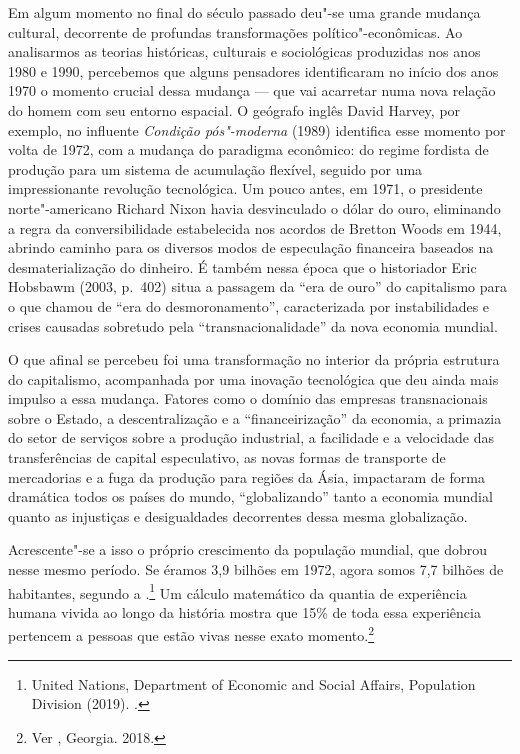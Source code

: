 Em algum momento no final do século passado deu"-se uma grande mudança
cultural, decorrente de profundas transformações político"-econômicas. Ao
analisarmos as teorias históricas, culturais e sociológicas produzidas
nos anos 1980 e 1990, percebemos que alguns pensadores identificaram no
início dos anos 1970 o momento crucial dessa mudança --- que vai
acarretar numa nova relação do homem com seu entorno espacial. O
geógrafo inglês David Harvey, por exemplo, no influente \emph{Condição
pós"-moderna} (1989) identifica esse momento por volta de 1972, com a
mudança do paradigma econômico: do regime fordista de produção para um
sistema de acumulação flexível, seguido por uma impressionante revolução
tecnológica. Um pouco antes, em 1971, o presidente norte"-americano
Richard Nixon havia desvinculado o dólar do ouro, eliminando a regra da
conversibilidade estabelecida nos acordos de Bretton Woods em 1944,
abrindo caminho para os diversos modos de especulação financeira
baseados na desmaterialização do dinheiro. É também nessa época que o
historiador Eric Hobsbawm (2003, p.~402) situa a passagem da ``era de ouro'' do
capitalismo para o que chamou de ``era do desmoronamento'',
caracterizada por instabilidades e crises causadas sobretudo pela
``transnacionalidade'' da nova economia mundial.

O que afinal se percebeu foi uma transformação no interior da própria
estrutura do capitalismo, acompanhada por uma inovação tecnológica que
deu ainda mais impulso a essa mudança. Fatores como o domínio das
empresas transnacionais sobre o Estado, a descentralização e a
``financeirização'' da economia, a primazia do setor de serviços sobre a
produção industrial, a facilidade e a velocidade das transferências de
capital especulativo, as novas formas de transporte de mercadorias e a
fuga da produção para regiões da Ásia, impactaram de forma dramática
todos os países do mundo, ``globalizando'' tanto a economia mundial
quanto as injustiças e desigualdades decorrentes dessa mesma
globalização.

Acrescente"-se a isso o próprio crescimento da população mundial, que
dobrou nesse mesmo período. Se éramos 3,9 bilhões em 1972, agora somos %
7,7 bilhões de habitantes, segundo a .\footnote{United Nations,
  Department of Economic and Social Affairs, Population Division (2019).
  {}.} Um cálculo
matemático da quantia de experiência humana vivida ao longo da história
mostra que 15\% de toda essa experiência pertencem a pessoas que estão
vivas nesse exato momento.\footnote{Ver , Georgia. {} 2018.}

